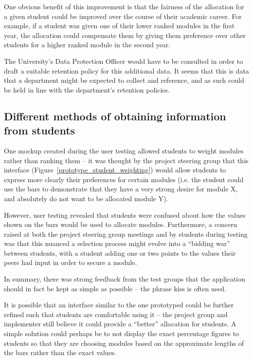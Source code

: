 \documentclass[draft]{scrartcl}
\begin{document}
One obvious benefit of this improvement is that the fairness of the allocation
for a given student could be improved over the course of their academic
career. For example, if a student was given one of their lower ranked modules
in the first year, the allocation could compensate them by giving them
preference over other students for a higher ranked module in the second
year.

The University's Data Protection Officer would have to be consulted in order
to draft a suitable retention policy for this additional data. It seems that
this is data that a department might be expected to collect and reference, and
as such could be held in line with the department's retention policies.

\subsection{Different methods of obtaining information from students}

One mockup created during the user testing allowed students to weight modules
rather than ranking them -- it was thought by the project steering group that
this interface (Figure~\ref{prototype_student_weighting}) would allow students
to express more clearly their preferences for certain modules (i.e. the
student could use the bars to demonstrate that they have a very strong desire
for module X, and absolutely do not want to be allocated module Y).

However, user testing revealed that students were confused about how the
values shown on the bars would be used to allocate modules. Furthermore, a
concern raised at both the project steering group meetings and by students
during testing was that this nuanced a selection process might evolve into a
``bidding war'' between students, with a student adding one or two points to
the values their peers had input in order to secure a module.

In summary, there was strong feedback from the test groups that the
application should in fact be kept as simple as possible -- the phrase
\gls{kiss} is often used.

It is possible that an interface similar to the one prototyped could be
further refined such that students are comfortable using it -- the project
group and implementer still believe it could provide a ``better'' allocation
for students. A simple solution could perhaps be to not display the exact
percentage figures to students so that they are choosing modules based on the
approximate lengths of the bars rather than the exact values.
\end{document}
